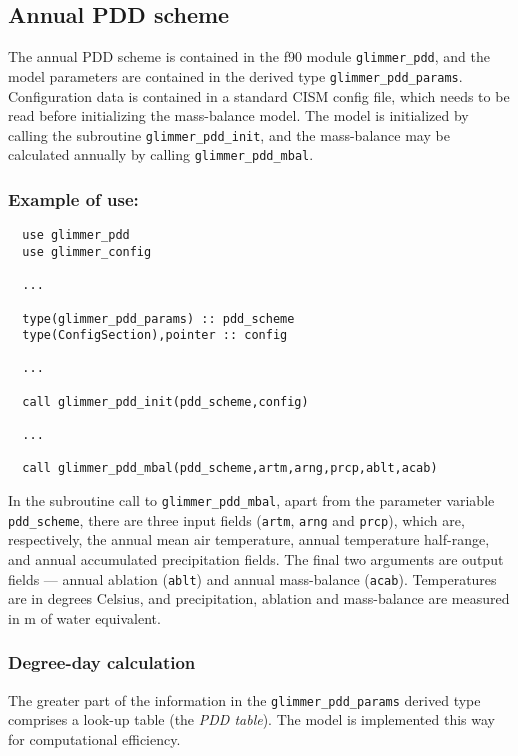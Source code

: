 \subsection{Annual PDD scheme}
\label{ug.mbal.pdd_scheme}
The annual PDD scheme is contained in the f90 module \texttt{glimmer\_pdd},
and the model parameters are contained in the derived type
\texttt{glimmer\_pdd\_params}. Configuration data is contained in a standard
CISM config file, which needs to be read before initializing the
mass-balance model. The model is initialized by calling the subroutine
\texttt{glimmer\_pdd\_init}, and the mass-balance may be calculated annually
by calling \texttt{glimmer\_pdd\_mbal}. 

\subsubsection{Example of use:}
\begin{verbatim}
  use glimmer_pdd
  use glimmer_config

  ...

  type(glimmer_pdd_params) :: pdd_scheme
  type(ConfigSection),pointer :: config

  ...

  call glimmer_pdd_init(pdd_scheme,config)

  ...

  call glimmer_pdd_mbal(pdd_scheme,artm,arng,prcp,ablt,acab)
\end{verbatim}
In the subroutine call to \texttt{glimmer\_pdd\_mbal}, apart from the
parameter variable \texttt{pdd\_scheme}, there are three input fields
(\texttt{artm}, \texttt{arng} and \texttt{prcp}), which are, respectively, the
annual mean air temperature, annual temperature half-range, and annual
accumulated precipitation fields. The final two arguments are output fields
--- annual ablation (\texttt{ablt}) and annual mass-balance
(\texttt{acab}). 
Temperatures are in degrees Celsius, and precipitation, ablation and mass-balance are measured in
m of water equivalent.
%

\subsubsection{Degree-day calculation}
%
The greater part of the information in the \texttt{glimmer\_pdd\_params}
derived type comprises a look-up table (the \emph{PDD table}). The model is
implemented this way for computational efficiency.


